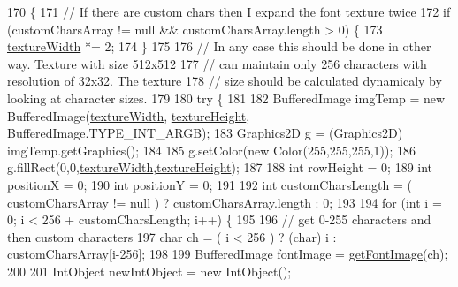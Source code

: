 \begin{DoxyCode}
170                                                       \{
171         \textcolor{comment}{// If there are custom chars then I expand the font texture twice       }
172         \textcolor{keywordflow}{if}  (customCharsArray != null && customCharsArray.length > 0) \{
173             \mbox{\hyperlink{classorg_1_1newdawn_1_1slick_1_1_true_type_font_a9b5d5e4b07516d5c5f2918de908a6305}{textureWidth}} *= 2;
174         \}
175         
176         \textcolor{comment}{// In any case this should be done in other way. Texture with size 512x512}
177         \textcolor{comment}{// can maintain only 256 characters with resolution of 32x32. The texture}
178         \textcolor{comment}{// size should be calculated dynamicaly by looking at character sizes. }
179         
180         \textcolor{keywordflow}{try} \{
181             
182             BufferedImage imgTemp = \textcolor{keyword}{new} BufferedImage(\mbox{\hyperlink{classorg_1_1newdawn_1_1slick_1_1_true_type_font_a9b5d5e4b07516d5c5f2918de908a6305}{textureWidth}}, 
      \mbox{\hyperlink{classorg_1_1newdawn_1_1slick_1_1_true_type_font_aca6f680b23843c55b4ac0fd6097204b5}{textureHeight}}, BufferedImage.TYPE\_INT\_ARGB);
183             Graphics2D g = (Graphics2D) imgTemp.getGraphics();
184 
185             g.setColor(\textcolor{keyword}{new} Color(255,255,255,1));
186             g.fillRect(0,0,\mbox{\hyperlink{classorg_1_1newdawn_1_1slick_1_1_true_type_font_a9b5d5e4b07516d5c5f2918de908a6305}{textureWidth}},\mbox{\hyperlink{classorg_1_1newdawn_1_1slick_1_1_true_type_font_aca6f680b23843c55b4ac0fd6097204b5}{textureHeight}});
187             
188             \textcolor{keywordtype}{int} rowHeight = 0;
189             \textcolor{keywordtype}{int} positionX = 0;
190             \textcolor{keywordtype}{int} positionY = 0;
191             
192             \textcolor{keywordtype}{int} customCharsLength = ( customCharsArray != null ) ? customCharsArray.length : 0; 
193 
194             for (\textcolor{keywordtype}{int} i = 0; i < 256 + customCharsLength; i++) \{
195                 
196                 \textcolor{comment}{// get 0-255 characters and then custom characters}
197                 \textcolor{keywordtype}{char} ch = ( i < 256 ) ? (\textcolor{keywordtype}{char}) i : customCharsArray[i-256];
198                 
199                 BufferedImage fontImage = \mbox{\hyperlink{classorg_1_1newdawn_1_1slick_1_1_true_type_font_aab88533daf9111e6f9c1514da3426d68}{getFontImage}}(ch);
200 
201                 IntObject newIntObject = \textcolor{keyword}{new} IntObject();

\end{DoxyCode}
